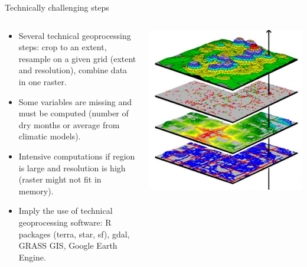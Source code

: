 \documentclass[10pt,table,dvipsnames,compress]{beamer}
\begin{document}
\begin{frame}[label={sec:org2f63c03}]{Technically challenging steps}
\begin{columns}
\begin{column}{0.7\columnwidth}
\begin{itemize}
\item Several technical geoprocessing steps: crop to an extent, resample on a given grid (extent and resolution), combine data in one raster.
\item Some variables are missing and must be computed (number of dry months or average from climatic models).
\item Intensive computations if region is large and resolution is high (raster might not fit in memory).
\item Imply the use of technical geoprocessing software: R packages (terra, star, sf), gdal, GRASS GIS, Google Earth Engine.
\end{itemize}
\end{column}

\begin{column}{0.3\columnwidth}
\begin{center}
\includegraphics[width=\textwidth]{figs/raster_stack.png}
\end{center}
\end{column}
\end{columns}
\end{frame}
\end{document}
